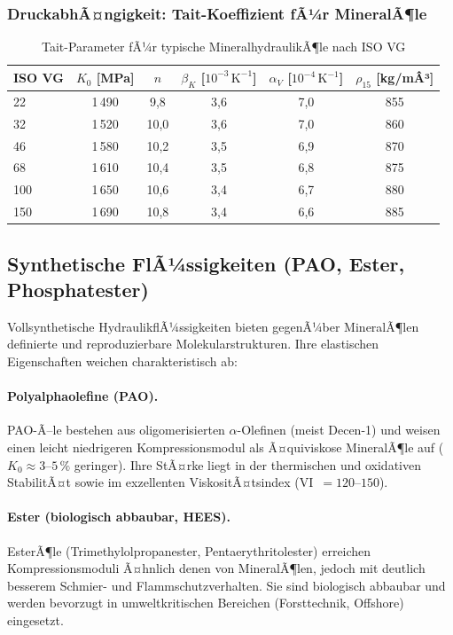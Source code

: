 ﻿\documentclass[a4paper,12pt]{scrreprt}
\theoremstyle{definition}
\begin{document}
\subsubsection{DruckabhÃ¤ngigkeit: Tait-Koeffizient fÃ¼r MineralÃ¶le}

\begin{table}[H]
  \centering
  \caption{Tait-Parameter fÃ¼r typische MineralhydraulikÃ¶le nach ISO VG}
  \label{tab:tait_parameter}
  \begin{tabular}{lccccc}
    \toprule
    ISO VG & $K_0$ [MPa] & $n$ & $\beta_K$ [$10^{-3}\,\mathrm{K}^{-1}$]
      & $\alpha_V$ [$10^{-4}\,\mathrm{K}^{-1}$] & $\rho_{15}$ [kg/mÂ³] \\
    \midrule
    22   & 1\,490 & 9{,}8  & 3{,}6 & 7{,}0 & 855 \\
    32   & 1\,520 & 10{,}0 & 3{,}6 & 7{,}0 & 860 \\
    46   & 1\,580 & 10{,}2 & 3{,}5 & 6{,}9 & 870 \\
    68   & 1\,610 & 10{,}4 & 3{,}5 & 6{,}8 & 875 \\
    100  & 1\,650 & 10{,}6 & 3{,}4 & 6{,}7 & 880 \\
    150  & 1\,690 & 10{,}8 & 3{,}4 & 6{,}6 & 885 \\
    \bottomrule
  \end{tabular}
\end{table}

\subsection{Synthetische FlÃ¼ssigkeiten (PAO, Ester, Phosphatester)}

Vollsynthetische HydraulikflÃ¼ssigkeiten bieten gegenÃ¼ber MineralÃ¶len
definierte und reproduzierbare Molekularstrukturen. Ihre elastischen
Eigenschaften weichen charakteristisch ab:

\paragraph{Polyalphaolefine (PAO).}
PAO-Ã–le bestehen aus oligomerisierten $\alpha$-Olefinen (meist Decen-1)
und weisen einen leicht niedrigeren Kompressionsmodul als Ã¤quiviskose
MineralÃ¶le auf ($K_0 \approx 3$--$5\,\%$ geringer). Ihre StÃ¤rke liegt
in der thermischen und oxidativen StabilitÃ¤t sowie im exzellenten
ViskositÃ¤tsindex (VI~$= 120$--$150$).

\paragraph{Ester (biologisch abbaubar, HEES).}
EsterÃ¶le (Trimethylolpropanester, Pentaerythritolester) erreichen
Kompressionsmoduli Ã¤hnlich denen von MineralÃ¶len, jedoch mit deutlich
besserem Schmier- und Flammschutzverhalten. Sie sind biologisch abbaubar
und werden bevorzugt in umweltkritischen Bereichen (Forsttechnik, Offshore)
eingesetzt.
\end{document}
